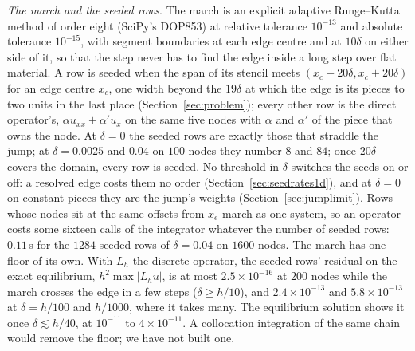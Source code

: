 \documentclass[11pt]{amsart}
\theoremstyle{definition}
\theoremstyle{remark}
\newcommand{\para}[1]{\par\smallskip\noindent\textit{#1}.\enspace}
\newcommand{\sci}[2]{#1 \times 10^{#2}}
\begin{document}
\para{The march and the seeded rows}
The march is an explicit adaptive Runge--Kutta method of order eight
(SciPy's DOP853) at relative tolerance $10^{-13}$ and absolute tolerance
$10^{-15}$, with segment boundaries at each edge centre and at $10 \delta$
on either side of it, so that the step never has to find the edge inside a
long step over flat material. A row is seeded when the span of its stencil
meets $(x_c - 20 \delta, x_c + 20 \delta)$ for an edge centre $x_c$,
one width beyond the $19\delta$ at which the edge is its pieces to two
units in the last place (Section~\ref{sec:problem}); every other row is the
direct operator's, $\alpha u_{xx} + \alpha' u_x$ on the same five nodes with
$\alpha$ and $\alpha'$ of the piece that owns the node. At $\delta = 0$ the seeded rows are exactly those that
straddle the jump; at $\delta = 0.0025$ and $0.04$ on $100$ nodes they
number $8$ and $84$; once $20 \delta$ covers the domain, every row is
seeded. No threshold in $\delta$ switches the seeds on or off: a resolved
edge costs them no order (Section~\ref{sec:seedrates1d}), and at
$\delta = 0$ on constant pieces they are the jump's weights
(Section~\ref{sec:jumplimit}).
Rows whose nodes sit at the same offsets from $x_e$ march as one system,
so an operator costs some sixteen calls of the integrator whatever the
number of seeded rows: $0.11$\,s for the $1284$ seeded rows of
$\delta = 0.04$ on $1600$ nodes. The march has one floor of its own. With
$L_h$ the discrete operator, the seeded rows' residual on the exact
equilibrium, $h^2 \max |L_h u|$, is at most $\sci{2.5}{-16}$ at $200$
nodes while the march crosses the edge in a few steps ($\delta \ge h/10$),
and $\sci{2.4}{-13}$ and $\sci{5.8}{-13}$ at $\delta = h/100$ and $h/1000$,
where it takes many. The equilibrium solution shows it once
$\delta \lesssim h/40$, at $10^{-11}$ to $\sci{4}{-11}$. A collocation
integration of the same chain would remove the floor; we have not built
one.
\end{document}
